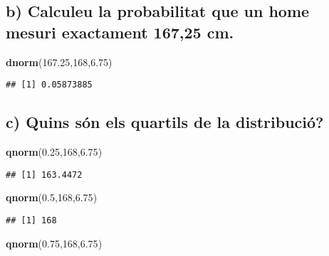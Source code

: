 \documentclass[
]{article}
\newenvironment{Shaded}{\begin{snugshade}}{\end{snugshade}}
\newcommand{\DecValTok}[1]{\textcolor[rgb]{0.00,0.00,0.81}{#1}}
\newcommand{\FloatTok}[1]{\textcolor[rgb]{0.00,0.00,0.81}{#1}}
\newcommand{\KeywordTok}[1]{\textcolor[rgb]{0.13,0.29,0.53}{\textbf{#1}}}
\newcommand{\NormalTok}[1]{#1}
\begin{document}
\hypertarget{b-calculeu-la-probabilitat-que-un-home-mesuri-exactament-16725-cm.}{%
\subsection{b) Calculeu la probabilitat que un home mesuri exactament
167,25
cm.}\label{b-calculeu-la-probabilitat-que-un-home-mesuri-exactament-16725-cm.}}

\begin{Shaded}
\begin{Highlighting}[]
\KeywordTok{dnorm}\NormalTok{(}\FloatTok{167.25}\NormalTok{,}\DecValTok{168}\NormalTok{,}\FloatTok{6.75}\NormalTok{)}
\end{Highlighting}
\end{Shaded}

\begin{verbatim}
## [1] 0.05873885
\end{verbatim}

\hypertarget{c-quins-suxf3n-els-quartils-de-la-distribuciuxf3}{%
\subsection{c) Quins són els quartils de la
distribució?}\label{c-quins-suxf3n-els-quartils-de-la-distribuciuxf3}}

\begin{Shaded}
\begin{Highlighting}[]
\KeywordTok{qnorm}\NormalTok{(}\FloatTok{0.25}\NormalTok{,}\DecValTok{168}\NormalTok{,}\FloatTok{6.75}\NormalTok{)}
\end{Highlighting}
\end{Shaded}

\begin{verbatim}
## [1] 163.4472
\end{verbatim}

\begin{Shaded}
\begin{Highlighting}[]
\KeywordTok{qnorm}\NormalTok{(}\FloatTok{0.5}\NormalTok{,}\DecValTok{168}\NormalTok{,}\FloatTok{6.75}\NormalTok{)}
\end{Highlighting}
\end{Shaded}

\begin{verbatim}
## [1] 168
\end{verbatim}

\begin{Shaded}
\begin{Highlighting}[]
\KeywordTok{qnorm}\NormalTok{(}\FloatTok{0.75}\NormalTok{,}\DecValTok{168}\NormalTok{,}\FloatTok{6.75}\NormalTok{)}
\end{Highlighting}
\end{Shaded}
\end{document}
